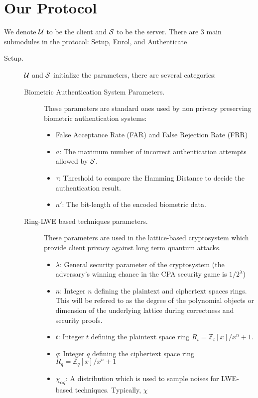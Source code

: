 \section{Our Protocol}
\label{sec:our_protocol}
We denote $\mathcal{U}$ to be the client and $\mathcal{S}$ to be the server. There are 3 main submodules in the protocol: Setup,
Enrol, and Authenticate
\begin{description}
\item[Setup.] $\mathcal{U}$ and $\mathcal{S}$ initialize the parameters, there are several categories:
  \begin{description}
  \item[Biometric Authentication System Parameters.] These parameters are standard ones used by non privacy preserving
    biometric authentication systems:
    \begin{itemize}
    \item False Acceptance Rate (FAR) and False Rejection Rate (FRR)
    \item $a$: The maximum number of incorrect authentication attempts allowed by $\mathcal{S}$.
    \item $\tau$: Threshold to compare the Hamming Distance to decide the authentication result.
    \item \(n'\): The bit-length of the encoded
      biometric data.
    \end{itemize}
  \item[Ring-LWE based techniques parameters.] These parameters are used in the lattice-based cryptosystem which provide
    client privacy against long term quantum attacks.
    \begin{itemize}
    \item $\lambda$: General security parameter of the cryptosystem (the adversary's winning chance in the CPA security game is \(1/2^{\lambda}\))
    \item $n$: Integer $n$ defining the plaintext and ciphertext spaces rings. This will be refered to as the degree of
      the polynomial objects or dimension of the underlying lattice during correctness and security proofs.
    \item $t$: Integer $t$ defining the plaintext space ring $R_t = \mathbb{Z}_t[x]/x^n+1$.
    \item $q$: Integer $q$ defining the ciphertext space ring $R_q = \mathbb{Z}_q[x]/x^n+1$
    \item $\chi_{\alpha q}$: A distribution which is used to sample noises for LWE-based techniques.  Typically, $\chi$

\end{itemize}
\end{description}
\end{description}
